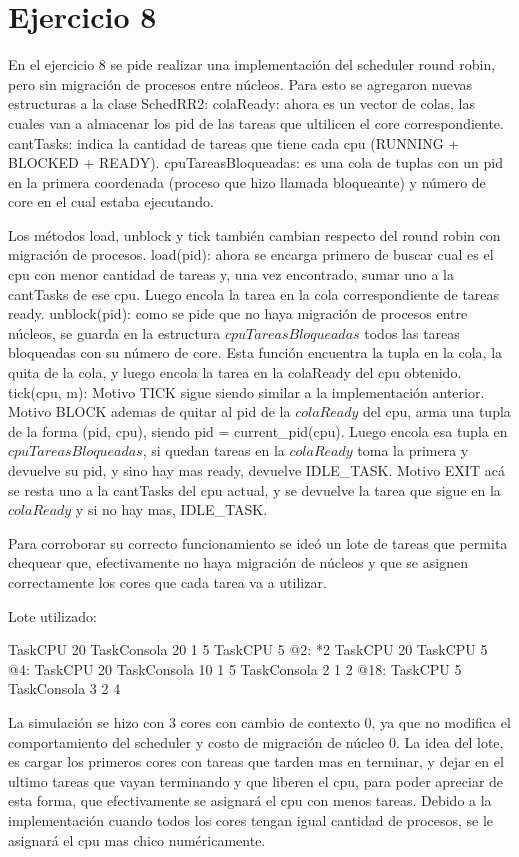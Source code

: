 \section{Ejercicio 8}

En el ejercicio 8 se pide realizar una implementación del scheduler round robin, pero sin migración de procesos entre núcleos.
Para esto se agregaron nuevas estructuras a la clase SchedRR2:
colaReady: ahora es un vector de colas, las cuales van a almacenar los pid de las tareas que ultilicen el core correspondiente.
cantTasks: indica la cantidad de tareas que tiene cada cpu (RUNNING + BLOCKED + READY).
cpuTareasBloqueadas: es una cola de tuplas con un pid en la primera coordenada (proceso que hizo llamada bloqueante) y número de core en el cual estaba ejecutando.

Los métodos load, unblock y tick también cambian respecto del round robin con migración de procesos.
load(pid): ahora se encarga primero de buscar cual es el cpu con menor cantidad de tareas y, una vez encontrado, sumar uno a la cantTasks de ese cpu. Luego encola la tarea en la cola correspondiente de tareas ready.
unblock(pid): como se pide que no haya migración de procesos entre núcleos, se guarda en la estructura $cpuTareasBloqueadas$ todos las tareas bloqueadas con su número de 
core. Esta función encuentra la tupla en la cola, la quita de la cola, y luego encola la tarea en la colaReady del cpu obtenido.
tick(cpu, m): 
Motivo TICK sigue siendo similar a la implementación anterior.
Motivo BLOCK ademas de quitar al pid de la $colaReady$ del cpu, arma una tupla de la forma (pid, cpu), siendo pid = current_pid(cpu). Luego encola esa tupla en $cpuTareasBloqueadas$, 
si quedan tareas en la $colaReady$ toma la primera y devuelve su pid, y sino hay mas ready, devuelve IDLE_TASK.
Motivo EXIT acá se resta uno a la cantTasks del cpu actual, y se devuelve la tarea que sigue en la $colaReady$ y si no hay mas, IDLE_TASK.

Para corroborar su correcto funcionamiento se ideó un lote de tareas que permita chequear que, efectivamente no haya migración de núcleos y que se asignen correctamente 
los cores que cada tarea va a utilizar. 

Lote utilizado:

TaskCPU 20		
TaskConsola 20	1 5	
TaskCPU 5
@2: 
*2 TaskCPU 20
TaskCPU 5
@4:
TaskCPU 20
TaskConsola 10 1 5
TaskConsola 2 1 2
@18:				
TaskCPU 5
TaskConsola 3 2 4

La simulación se hizo con 3 cores con cambio de contexto 0, ya que no modifica el comportamiento del scheduler y costo de migración de núcleo 0.
La idea del lote, es cargar los primeros cores con tareas que tarden mas en terminar, y dejar en el ultimo tareas que vayan terminando y que liberen el cpu, 
para poder apreciar de esta forma, que efectivamente se asignará el cpu con menos tareas.
Debido a la implementación cuando todos los cores tengan igual cantidad de procesos, se le asignará el cpu mas chico numéricamente. 

